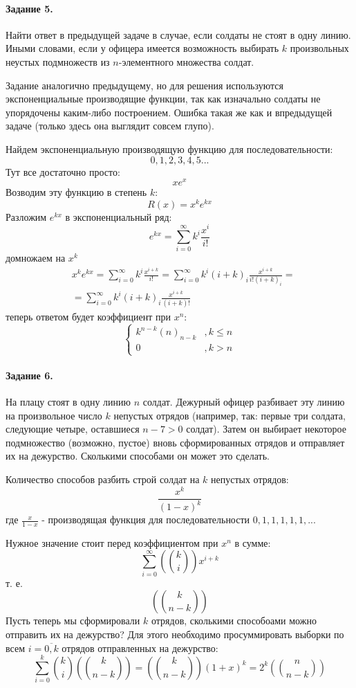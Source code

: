 \documentclass[a4paper,12pt]{article}
\begin{document}
\paragraph{Задание 5.} Найти ответ в предыдущей задаче в случае, если солдаты не стоят в одну линию. Иными словами, если у офицера имеется возможность выбирать $k$ произвольных неустых подмножеств из $n$-элементного множества солдат.

\begin{Solution}
Задание аналогично предыдущему, но для решения используются экспоненциальные производящие функции, так как изначально солдаты не упорядочены каким-либо построением. Ошибка такая же как и впредыдущей задаче (только здесь она выглядит совсем глупо).

Найдем экспоненциальную производящую функцию для последовательности:
\[
	0, 1, 2, 3, 4, 5 ...
\]
Тут все достаточно просто:
\[
	x e^x
\]
Возводим эту функцию в степень $k$:
\[
	R\left(x\right) = x^k e^{kx}
\]
Разложим $e^{kx}$ в экспоненциальный ряд:
\[
	e^{kx} = \sum_{i=0}^{\infty} k^i \frac{x^i}{i!}
\]
домножаем на $x^k$
\[
	\begin{split}
		& x^ke^{kx} = \sum_{i=0}^{\infty} k^i \frac{x^{i+k}}{i!} = \sum_{i=0}^{\infty} k^i \left(i+k\right)_i \frac{x^{i+k}}{i!\left(i+k\right)_i} = \\
		& = \sum_{i=0}^{\infty} k^i \left(i+k\right)_i \frac{x^{i+k}}{\left(i+k\right)!}
	\end{split}
\]
теперь ответом будет коэффициент при $x^n$:
\[
	\begin{cases}
		k^{n-k} \left(n\right)_{n-k} & , k \le n \\
		0 & , k > n
	\end{cases}
\]
\end{Solution}

\paragraph{Задание 6.} На плацу стоят в одну линию $n$ солдат. Дежурный офицер разбивает эту линию на произвольное число $k$ непустых отрядов (например, так: первые три солдата, следующие четыре, оставшиеся $n-7>0$ солдат). Затем он выбирает некоторое подмножество (возможно, пустое) вновь сформированных отрядов и отправляет их на дежурство. Сколькими способами он может это сделать.

\begin{Solution}
Количество способов разбить строй солдат на $k$ непустых отрядов:
\[
	\frac{x^k}{\left(1-x\right)^k}
\]
где $\frac{x}{1-x}$ - производящая функция для последовательности $0, 1, 1, 1, 1, 1, ...$

Нужное значение стоит перед коэффициентом при $x^n$ в сумме:
\[
	\sum_{i=0}^{\infty} \left(\binom{k}{i}\right) x^{i+k}
\]
т. е.
\[
	\left(\binom{k}{n-k}\right)
\]
Пусть теперь мы сформировали $k$ отрядов, сколькими способоами можно отправить их на дежурство? Для этого необходимо просуммировать выборки по всем $i = \overline{0,k}$ отрядов отправленных на дежурство:
\[
	\sum_{i=0}^{k} \binom{k}{i} \left(\binom{k}{n-k}\right) = \left(\binom{k}{n-k}\right)\left(1+x\right)^k = 2^k \left(\binom{n}{n-k}\right)
\]
\end{Solution}
\end{document}
